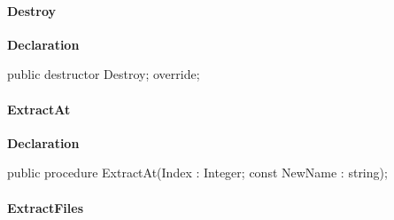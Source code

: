 \documentclass{report}
\newif\ifpdf
\begin{document}
\paragraph*{Destroy}\hspace*{\fill}

\label{AbUnzper.TAbCustomUnZipper-Destroy}
\begin{list}{}{
\setlength{\itemindent}{0cm}
\setlength{\listparindent}{0cm}
\setlength{\leftmargin}{\evensidemargin}
\addtolength{\leftmargin}{\tmplength}
\settowidth{\labelsep}{X}
\addtolength{\leftmargin}{\labelsep}
\setlength{\labelwidth}{\tmplength}
}
\item[\textbf{Declaration}\hfill]
\ifpdf
\begin{flushleft}
\fi
\begin{ttfamily}
public destructor Destroy; override;\end{ttfamily}

\ifpdf
\end{flushleft}
\fi

\end{list}
\paragraph*{ExtractAt}\hspace*{\fill}

\label{AbUnzper.TAbCustomUnZipper-ExtractAt}
\begin{list}{}{
\setlength{\itemindent}{0cm}
\setlength{\listparindent}{0cm}
\setlength{\leftmargin}{\evensidemargin}
\addtolength{\leftmargin}{\tmplength}
\settowidth{\labelsep}{X}
\addtolength{\leftmargin}{\labelsep}
\setlength{\labelwidth}{\tmplength}
}
\item[\textbf{Declaration}\hfill]
\ifpdf
\begin{flushleft}
\fi
\begin{ttfamily}
public procedure ExtractAt(Index : Integer; const NewName : string);\end{ttfamily}

\ifpdf
\end{flushleft}
\fi

\end{list}
\paragraph*{ExtractFiles}\hspace*{\fill}
\end{document}
